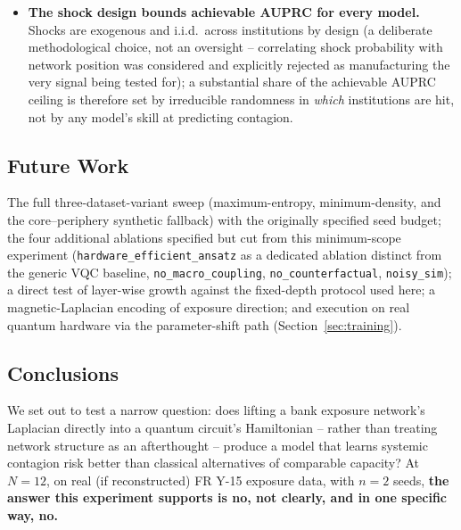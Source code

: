 \documentclass[journal]{IEEEtran}
\begin{document}
\begin{itemize}
        unnecessary at $N=12$ by a targeted diagnostic
        (Section~\ref{sec:ansatz}), and dropped from every reported
        model in favor of a matched fixed-depth protocol. Whether growth
        would help further, or matter more at larger $N$, is untested.
  \item \textbf{The shock design bounds achievable AUPRC for every
        model.} Shocks are exogenous and i.i.d.\ across institutions by
        design (a deliberate methodological choice, not an oversight --
        correlating shock probability with network position was
        considered and explicitly rejected as manufacturing the very
        signal being tested for); a substantial share of the achievable
        AUPRC ceiling is therefore set by irreducible randomness in
        \emph{which} institutions are hit, not by any model's skill at
        predicting contagion.
\end{itemize}

\subsection{Future Work}
\label{sec:future-work}

The full three-dataset-variant sweep (maximum-entropy, minimum-density,
and the core--periphery synthetic fallback) with the originally
specified seed budget; the four additional ablations specified but cut
from this minimum-scope experiment (\texttt{hardware\_efficient\_ansatz}
as a dedicated ablation distinct from the generic VQC baseline,
\texttt{no\_macro\_coupling}, \texttt{no\_counterfactual},
\texttt{noisy\_sim}); a direct test of layer-wise growth against the
fixed-depth protocol used here; a magnetic-Laplacian encoding of exposure
direction; and execution on real quantum hardware via the
parameter-shift path (Section~\ref{sec:training}).

\subsection{Conclusions}

We set out to test a narrow question: does lifting a bank exposure
network's Laplacian directly into a quantum circuit's Hamiltonian --
rather than treating network structure as an afterthought -- produce a
model that learns systemic contagion risk better than classical
alternatives of comparable capacity? At $N=12$, on real (if reconstructed)
FR Y-15 exposure data, with $n=2$ seeds, \textbf{the answer this
experiment supports is no, not clearly, and in one specific way, no.}
\end{document}
